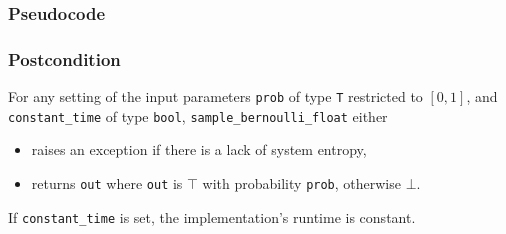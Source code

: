 \documentclass{article}
\begin{document}
\subsubsection*{Pseudocode}



\subsubsection*{Postcondition}

\begin{definition}
    \label{sample-bernoulli}
    For any setting of the input parameters
    \texttt{prob} of type \texttt{T} restricted to $[0, 1]$,
    and \texttt{constant\_time} of type \texttt{bool},
    \texttt{sample\_bernoulli\_float} either
    \begin{itemize}
        \item raises an exception if there is a lack of system entropy,
        \item returns \texttt{out} where \texttt{out} is $\top$ with probability \texttt{prob}, otherwise $\bot$.
    \end{itemize}
     If \texttt{constant\_time} is set, the implementation's runtime is constant.
\end{definition}
\end{document}
